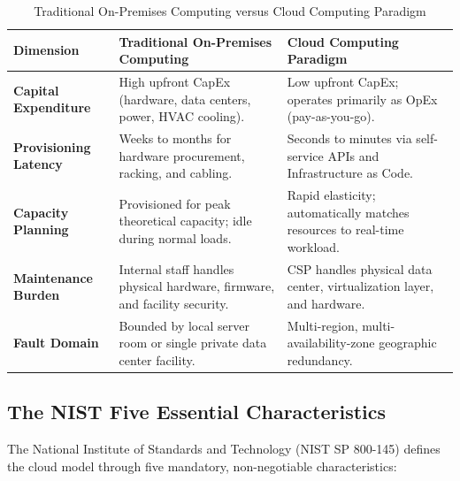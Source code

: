 \begin{table}[htbp]
\centering
\small
\caption{Traditional On-Premises Computing versus Cloud Computing Paradigm}
\label{tab:onprem_vs_cloud}
\begin{tabularx}{\textwidth}{p{3.2cm}Xp{5.5cm}}
\toprule
\textbf{Dimension} & \textbf{Traditional On-Premises Computing} & \textbf{Cloud Computing Paradigm} \\
\midrule
\textbf{Capital Expenditure} & High upfront CapEx (hardware, data centers, power, HVAC cooling). & Low upfront CapEx; operates primarily as OpEx (pay-as-you-go). \\
\textbf{Provisioning Latency} & Weeks to months for hardware procurement, racking, and cabling. & Seconds to minutes via self-service APIs and Infrastructure as Code. \\
\textbf{Capacity Planning} & Provisioned for peak theoretical capacity; idle during normal loads. & Rapid elasticity; automatically matches resources to real-time workload. \\
\textbf{Maintenance Burden} & Internal staff handles physical hardware, firmware, and facility security. & CSP handles physical data center, virtualization layer, and hardware. \\
\textbf{Fault Domain} & Bounded by local server room or single private data center facility. & Multi-region, multi-availability-zone geographic redundancy. \\
\bottomrule
\end{tabularx}
\end{table}

\subsection{The NIST Five Essential Characteristics}
The National Institute of Standards and Technology (NIST SP 800-145) defines the cloud model through five mandatory, non-negotiable characteristics:

